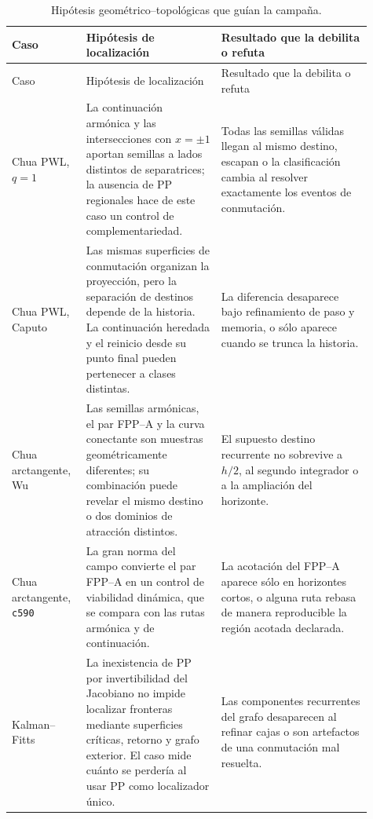\begin{longtable}{@{}p{0.17\linewidth}p{0.35\linewidth}p{0.39\linewidth}@{}}
\caption{Hipótesis geométrico--topológicas que guían la campaña.}
\label{camp:tab-hypotheses}\\
\toprule
Caso & Hipótesis de localización & Resultado que la debilita o refuta\\
\midrule
\endfirsthead
\toprule
Caso & Hipótesis de localización & Resultado que la debilita o refuta\\
\midrule
\endhead
Chua PWL, \(q=1\)
& La continuación armónica y las intersecciones con \(x=\pm1\) aportan semillas
  a lados distintos de separatrices; la ausencia de PP regionales hace de este
  caso un control de complementariedad.
& Todas las semillas válidas llegan al mismo destino, escapan o la clasificación
  cambia al resolver exactamente los eventos de conmutación.\\

Chua PWL, Caputo
& Las mismas superficies de conmutación organizan la proyección, pero la
  separación de destinos depende de la historia. La continuación heredada y
  el reinicio desde su punto final pueden pertenecer a clases distintas.
& La diferencia desaparece bajo refinamiento de paso y memoria, o sólo aparece
  cuando se trunca la historia.\\

Chua arctangente, Wu
& Las semillas armónicas, el par FPP--A y la curva conectante son muestras
  geométricamente diferentes; su combinación puede revelar el mismo destino o
  dos dominios de atracción distintos.
& El supuesto destino recurrente no sobrevive a \(h/2\), al segundo integrador
  o a la ampliación del horizonte.\\

Chua arctangente, \texttt{c590}
& La gran norma del campo convierte el par FPP--A en un control de viabilidad
  dinámica, que se compara con las rutas armónica y de continuación.
& La acotación del FPP--A aparece sólo en horizontes cortos, o alguna ruta
  rebasa de manera reproducible la región acotada declarada.\\

Kalman--Fitts
& La inexistencia de PP por invertibilidad del Jacobiano no impide localizar
  fronteras mediante superficies críticas, retorno y grafo exterior. El caso
  mide cuánto se perdería al usar PP como localizador único.
& Las componentes recurrentes del grafo desaparecen al refinar cajas o son
  artefactos de una conmutación mal resuelta.\\


\end{longtable}
